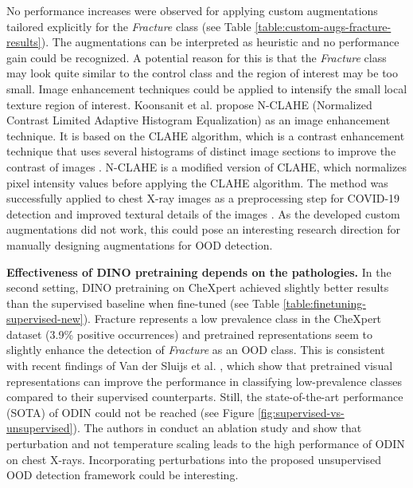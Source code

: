 No performance increases were observed for applying custom augmentations tailored explicitly for the \textit{Fracture} class (see Table \ref{table:custom-augs-fracture-results}).
The augmentations can be interpreted as heuristic and no performance gain could be recognized.
A potential reason for this is that the \textit{Fracture} class may look quite similar to the control class and the region of interest may be too small. 
Image enhancement techniques could be applied to intensify the small local texture region of interest.
Koonsanit et al. \citep{Koonsanit2017} propose N-CLAHE (Normalized Contrast Limited Adaptive Histogram Equalization) as an image enhancement technique.
It is based on the CLAHE algorithm, which is a contrast enhancement technique that uses several histograms of distinct image sections to improve the contrast of images \citep{Zuiderveld1994}.
N-CLAHE is a modified version of CLAHE, which normalizes pixel intensity values before applying the CLAHE algorithm.
The method was successfully applied to chest X-ray images as a preprocessing step for COVID-19 detection and improved textural details of the images \citep{Horry2020}.
As the developed custom augmentations did not work, this could pose an interesting research direction for manually designing augmentations for OOD detection.
\par
\textbf{Effectiveness of DINO pretraining depends on the pathologies.} 
In the second setting, DINO pretraining on CheXpert achieved slightly better results than the supervised baseline when fine-tuned (see Table \ref{table:finetuning-supervised-new}).
Fracture represents a low prevalence class in the CheXpert dataset (3.9\% positive occurrences) and pretrained representations seem to slightly enhance the detection of \textit{Fracture} as an OOD class.
This is consistent with recent findings of Van der Sluijs et al. \citep{Vandersluijs2023}, which show that pretrained visual representations can improve the performance in classifying low-prevalence classes compared to their supervised counterparts.
Still, the state-of-the-art performance (SOTA) of ODIN could not be reached (see Figure \ref{fig:supervised-vs-unsupervised}).
The authors in \citep{Berger2021} conduct an ablation study and show that perturbation and not temperature scaling leads to the high performance of ODIN on chest X-rays.
Incorporating perturbations into the proposed unsupervised OOD detection framework could be interesting.
